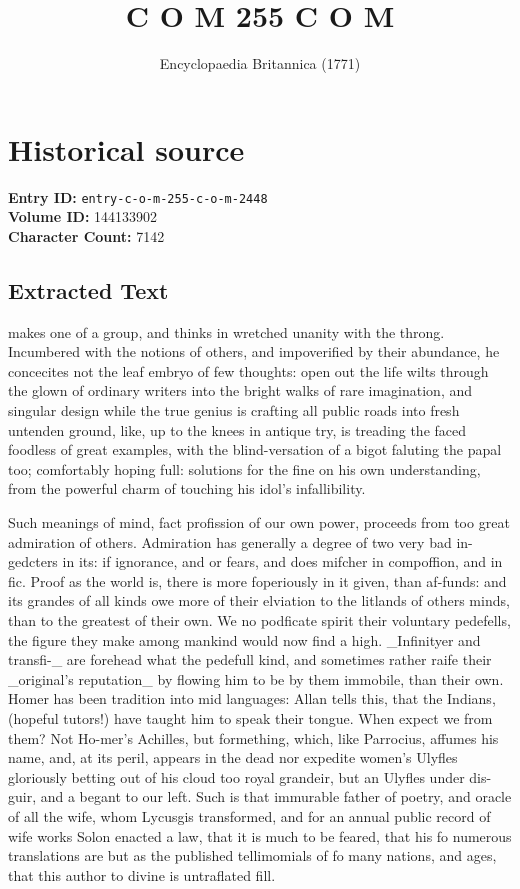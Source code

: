 \documentclass{article}
\title{C O M  255  C O M}
\date{Encyclopaedia Britannica (1771)}
\begin{document}
\maketitle

\section*{Historical source}
\textbf{Entry ID:} \texttt{entry-c-o-m-255-c-o-m-2448} \\
\textbf{Volume ID:} 144133902 \\
\textbf{Character Count:} 7142

\subsection*{Extracted Text}
makes one of a group, and thinks in wretched unanity with the throng. Incumbered with the notions of others, and impoverified by their abundance, he concecites not the leaf embryo of few thoughts: open out the life wilts through the glown of ordinary writers into the bright walks of rare imagination, and singular design while the true genius is crafting all public roads into fresh untenden ground, like, up to the knees in antique try, is treading the faced foodless of great examples, with the blind-versation of a bigot faluting the papal too; comfortably hoping full: solutions for the fine on his own understanding, from the powerful charm of touching his idol's infallibility.

Such meanings of mind, fact profission of our own power, proceeds from too great admiration of others. Admiration has generally a degree of two very bad in-gedcters in its: if ignorance, and or fears, and does mifcher in compoffion, and in fic. Proof as the world is, there is more foperiously in it given, than af-funds: and its grandes of all kinds owe more of their elviation to the litlands of others minds, than to the greatest of their own. We no podficate spirit their voluntary pedefells, the figure they make among mankind would now find a high. \_Infinityer and transfi-\_ are forehead what the pedefull kind, and sometimes rather raife their \_original’s reputation\_ by flowing him to be by them immobile, than their own. Homer has been tradition into mid languages: Allan tells this, that the Indians, (hopeful tutors!) have taught him to speak their tongue. When expect we from them? Not Ho-mer's Achilles, but formething, which, like Parrocius, affumes his name, and, at its peril, appears in the dead nor expedite women’s Ulyfles gloriously betting out of his cloud too royal grandeir, but an Ulyfles under dis-guir, and a begant to our left. Such is that immurable father of poetry, and oracle of all the wife, whom Lycusgis transformed, and for an annual public record of wife works Solon enacted a law, that it is much to be feared, that his fo numerous translations are but as the published tellimomials of fo many nations, and ages, that this author to divine is untraflated fill.
\end{document}
